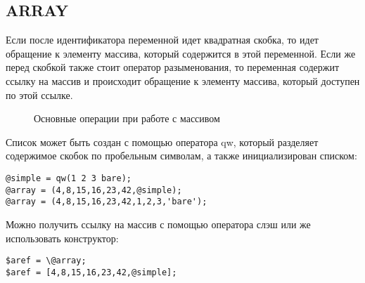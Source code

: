 \subsection{ARRAY} %
Если после идентификатора переменной идет квадратная скобка, то идет обращение  к элементу массива, который содержится в этой переменной. Если же перед скобкой также стоит оператор разыменования, то переменная содержит ссылку на массив и происходит обращение к элементу массива, который доступен по этой ссылке.
\begin{figure}[H] \centering
  \caption{Основные операции при работе с массивом}
\end{figure}
Список может быть создан с помощью оператора qw, который разделяет содержимое скобок по пробельным символам, а также инициализирован списком:
\begin{verbatim}
@simple = qw(1 2 3 bare);
@array = (4,8,15,16,23,42,@simple);
@array = (4,8,15,16,23,42,1,2,3,'bare');
\end{verbatim}
Можно получить ссылку на массив с помощью оператора слэш или же использовать конструктор:
\begin{verbatim}
$aref = \@array;
$aref = [4,8,15,16,23,42,@simple];
\end{verbatim}
